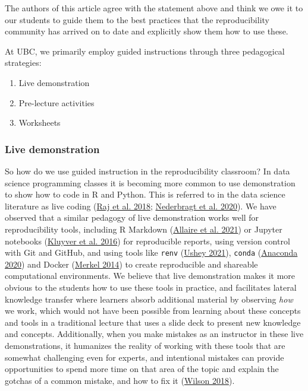 \documentclass[
  12 pt,
]{paper}
\providecommand{\tightlist}{%
  \setlength{\itemsep}{0pt}\setlength{\parskip}{0pt}}
\begin{document}
The authors of this article agree with the statement above
and think we owe it to our students to guide them
to the best practices that the reproducibility community has
arrived on to date and explicitly show them how to use these.

At UBC,
we primarily employ guided instructions through three pedagogical strategies:

\begin{enumerate}
\def\labelenumi{\arabic{enumi}.}
\tightlist
\item
  Live demonstration
\item
  Pre-lecture activities
\item
  Worksheets
\end{enumerate}

\hypertarget{live-demonstration}{%
\subsubsection{Live demonstration}\label{live-demonstration}}

So how do we use guided instruction in the reproducibility classroom?
In data science programming classes it is becoming more common to use demonstration
to show how to code in R and Python.
This is referred to in the data science literature as live coding
(\protect\hyperlink{ref-raj2018role}{Raj et al. 2018}; \protect\hyperlink{ref-nederbragt2020ten}{Nederbragt et al. 2020}).
We have observed that a similar pedagogy of live demonstration
works well for reproducibility tools,
including R Markdown (\protect\hyperlink{ref-xie2021dynamic}{Allaire et al. 2021}) or Jupyter notebooks (\protect\hyperlink{ref-kluyver2016jupyter}{Kluyver et al. 2016}) for reproducible reports,
using version control with Git and GitHub,
and using tools like \texttt{renv} (\protect\hyperlink{ref-kusheyrenv}{Ushey 2021}), \texttt{conda} (\protect\hyperlink{ref-anaconda}{Anaconda 2020})
and Docker (\protect\hyperlink{ref-merkel2014docker}{Merkel 2014}) to create reproducible and shareable computational environments.
We believe that live demonstration makes it more obvious to the students
how to use these tools in practice,
and facilitates lateral knowledge transfer
where learners absorb additional material by observing \emph{how} we work,
which would not have been possible from learning about these
concepts and tools in a traditional lecture that uses a slide deck
to present new knowledge and concepts.
Additionally, when you make mistakes as an instructor in these live demonstrations,
it humanizes the reality of working with these tools that are
somewhat challenging even for experts,
and intentional mistakes can provide opportunities to spend more time on
that area of the topic and explain the gotchas of a common mistake,
and how to fix it (\protect\hyperlink{ref-wilson_wilson_2018}{Wilson 2018}).
\end{document}
